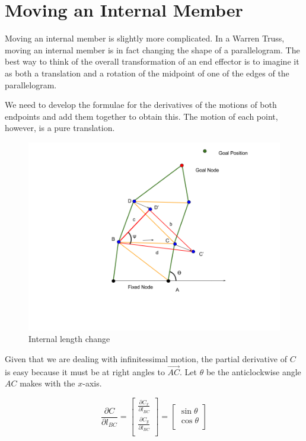 \documentclass[11pt]{article}
\begin{document}
\section{Moving an Internal Member}

Moving an internal member is slightly more complicated. In a Warren Truss, moving an internal member is in fact
changing the shape of a parallelogram.  The best way to think of the overall transformation of an end effector is
to imagine it as both a translation and a rotation of the midpoint of one of the edges of the parallelogram.

We need to develop the formulae for the derivatives of the motions of both endpoints and add them together to obtain this.
The motion of each point, however, is a pure translation.

\begin{figure}
  \centering
  \includegraphics[width=\textwidth]{Internal angle change.png}
  \caption{Internal length change}  
\end{figure}

Given that we are dealing with infinitessimal motion, the partial derivative of $C$ is easy
because it must be at right angles to $\vec{AC}$. Let $\theta$ be the anticlockwise angle $AC$ makes with the $x$-axis.

\[
\frac{\partial C}{\partial  l_{BC}} = \begin{bmatrix}
           \frac{\partial C_x}{\partial l_{BC}} \\
           \frac{\partial C_y}{\partial l_{BC}} \\
         \end{bmatrix} = \begin{bmatrix}
           \sin{\theta}  \\
           \cos{\theta} \\
         \end{bmatrix}
\]
\end{document}
